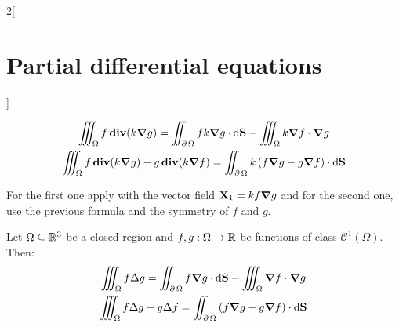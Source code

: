 \documentclass[../../../main_math.tex]{subfiles}
\begin{document}
\begin{multicols}{2}[\section{Partial differential equations}]
\begin{proposition}
    \begin{gather*}
      \iiint_\Omega f\operatorname{\boldsymbol{\mathrm{div}}}(k\grad{g})                                =\iint_{\operatorname{\partial}{\Omega}}fk\grad{g}\cdot\dd{\boldsymbol{\mathrm{S}}} -\iiint_\Omega k\grad{f}\cdot\grad{g} \\
      \iiint_\Omega f\operatorname{\boldsymbol{\mathrm{div}}}(k\grad{g})-g\operatorname{\boldsymbol{\mathrm{div}}}(k\grad{f})  =\iint_{\operatorname{\partial}{\Omega}} k\left(f\grad{g}-g\grad{f}\right)\cdot\dd{\boldsymbol{\mathrm{S}}}
    \end{gather*}
  \end{proposition}
  \begin{sproof}
    For the first one apply  with the vector field $\boldsymbol{\mathrm{X}}_1 = kf\grad{g}$ and for the second one, use the previous formula and the symmetry of $f$ and $g$.
  \end{sproof}
  \begin{corollary}
    Let $\Omega\subseteq\mathbb{R}^3$ be a closed region and $f,g:\Omega\rightarrow\mathbb{R}$ be functions of class $\mathcal{C}^1(\Omega)$. Then:
    \begin{gather*}
      \iiint_\Omega f\Delta{g}                              =\iint_{\operatorname{\partial}{\Omega}}f\grad{g}\cdot\dd{\boldsymbol{\mathrm{S}}} -\iiint_\Omega \grad{f}\cdot\grad{g} \\
      \iiint_\Omega f\Delta{g}-g\Delta{f}  =\iint_{\operatorname{\partial}{\Omega}} \left(f\grad{g}-g\grad{f}\right)\cdot\dd{\boldsymbol{\mathrm{S}}}
    \end{gather*}
  \end{corollary}

\end{multicols}
\end{document}
